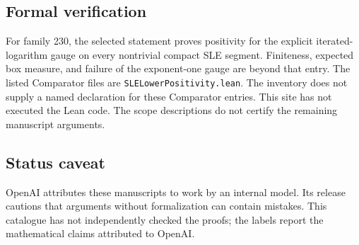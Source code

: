 \documentclass[11pt]{article}
\begin{document}
\subsection{Formal verification}
For family 230, the selected statement proves positivity for the explicit iterated-logarithm gauge on every nontrivial compact SLE segment. Finiteness, expected box measure, and failure of the exponent-one gauge are beyond that entry. The listed Comparator files are \texttt{SLELowerPositivity.lean}. The inventory does not supply a named declaration for these Comparator entries. This site has not executed the Lean code. The scope descriptions do not certify the remaining manuscript arguments.

\subsection{Status caveat}
OpenAI attributes these manuscripts to work by an internal model. Its release cautions that arguments without formalization can contain mistakes. This catalogue has not independently checked the proofs; the labels report the mathematical claims attributed to OpenAI.
\end{document}
